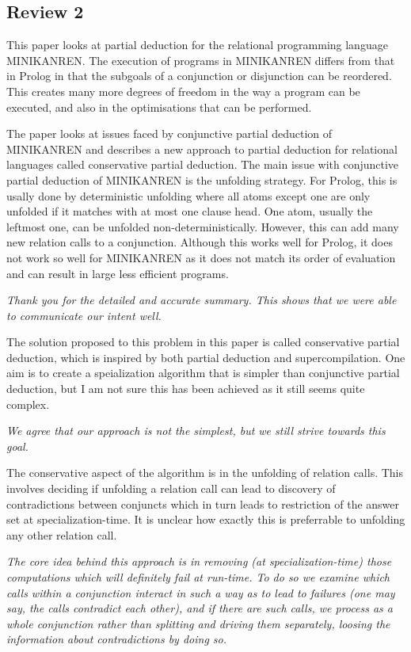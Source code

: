 
\subsection*{Review 2}

This paper looks at partial deduction for the relational programming language  MINIKANREN. The execution of programs in MINIKANREN differs from that in Prolog in that the subgoals of a conjunction or disjunction can be reordered. This creates many more degrees of freedom in the way a program can be executed, and also in the optimisations that can be performed.

The paper looks at issues faced by conjunctive partial deduction of MINIKANREN and describes a new approach to partial deduction for relational languages called conservative partial deduction. The main issue with conjunctive partial deduction of MINIKANREN is the unfolding strategy. For Prolog, this is usally done by deterministic unfolding where all atoms except one are only unfolded if it matches with at most one clause head. One atom, usually the leftmost one, can be unfolded non-deterministically. However, this can add many new relation calls to a conjunction. Although this works well for Prolog, it does not work so well for MINIKANREN as it does not match its order of evaluation and can result in large less efficient programs.

\emph{Thank you for the detailed and accurate summary. This shows that we were able to communicate our intent well.}

The solution proposed to this problem in this paper is called conservative partial deduction, which is inspired by both partial deduction and supercompilation. One aim is to create a speialization algorithm that is simpler than conjunctive partial deduction, but I am not sure this has been achieved as it still seems quite complex.

\emph{We agree that our approach is not the simplest, but we still strive towards this goal.}

The conservative aspect of the algorithm is in the unfolding of relation calls. This involves deciding if unfolding a relation call can lead to discovery of contradictions between conjuncts which in turn leads to restriction of the answer set at specialization-time. It is unclear how exactly this is preferrable to unfolding any other relation call.

\emph{The core idea behind this approach is in removing (at specialization-time) those computations which will definitely fail at run-time. To do so we examine which calls within a conjunction interact in such a way as to lead to failures (one may say, the calls contradict each other), and if there are such calls, we process as a whole conjunction rather than splitting and driving them separately, loosing the information about contradictions by doing so.}

